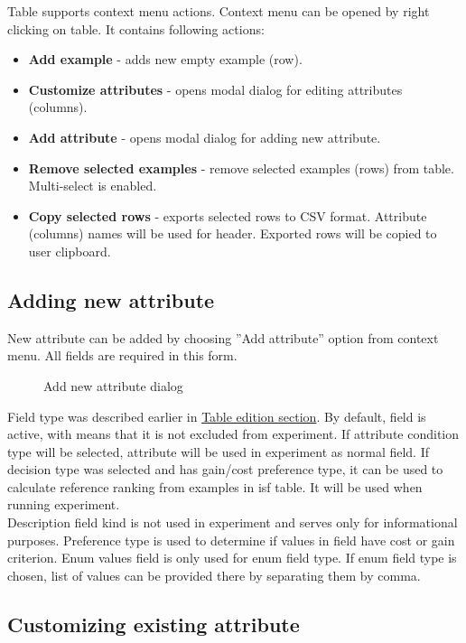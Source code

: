 Table supports context menu actions. Context menu can be opened by right clicking on table. It contains following actions:
\begin{itemize}
	\item \textbf{Add example} - adds new empty example (row).
	\item \textbf{Customize attributes} - opens modal dialog for editing attributes (columns).
	\item \textbf{Add attribute} - opens modal dialog for adding new attribute.
	\item \textbf{Remove selected examples} - remove selected examples (rows) from table. Multi-select is enabled.
	\item \textbf{Copy selected rows} - exports selected rows to CSV format. Attribute (columns) names will be used for header. Exported rows will be copied to user clipboard.
\end{itemize}

\subsection{Adding new attribute}\label{sub:isf-add-attr}

New attribute can be added by choosing ''Add attribute'' option from context menu. All fields are required in this form.

\begin{figure*}[!ht] 
	\centering
	\caption{Add new attribute dialog}
\end{figure*}

Field type was described earlier in \hyperref[sub:isf-examples]{Table edition section}. By default, field is active, with means that it is not excluded from experiment.
If attribute condition type will be selected, attribute will be used in experiment as normal field. If decision type was selected and has gain/cost preference type, it can be used to calculate reference ranking from examples in isf table. It will be used when running experiment. 
\\ Description field kind is not used in experiment and serves only for informational purposes. Preference type is used to determine if values in field have cost or gain criterion. Enum values field is only used for enum field type. If enum field type is chosen, list of values can be provided there by separating them by comma.

\subsection{Customizing existing attribute}\label{sub:isf-cust-attr}


